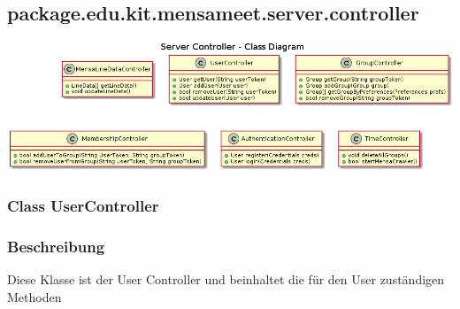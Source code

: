\documentclass[a4paper]{scrreprt}
\begin{document}



\subsection{package.edu.kit.mensameet.server.controller}
\begin{center}
	\includegraphics[width=1.1\textwidth]{Klassendiagramme/serverControllerCD.png}
\end{center}
\subsubsection{Class UserController}
\subsubsection*{Beschreibung}
Diese Klasse ist der User Controller und beinhaltet die für den User zuständigen Methoden
\end{document}
